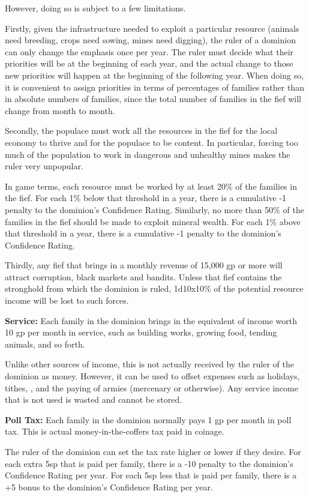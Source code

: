 \begin{multicols*}{2}
However, doing so is subject to a few limitations.

Firstly, given the infrastructure needed to exploit a particular resource (animals need breeding, crops need sowing, mines need digging), the ruler of a dominion can only change the emphasis once per year. The ruler must decide what their priorities will be at the beginning of each year, and the actual change to those new priorities will happen at the beginning of the following year. When doing so, it is convenient to assign priorities in terms of percentages of families rather than in absolute numbers of families, since the total number of families in the fief will change from month to month.

Secondly, the populace must work all the resources in the fief for the local economy to thrive and for the populace to be content. In particular, forcing too much of the population to work in dangerous and unhealthy mines makes the ruler very unpopular.

In game terms, each resource must be worked by at least 20\% of the families in the fief. For each 1\% below that threshold in a year, there is a cumulative -1 penalty to the dominion’s Confidence Rating. Similarly, no more than 50\% of the families in the fief should be made to exploit mineral wealth. For each 1\% above that threshold in a year, there is a cumulative -1 penalty to the dominion’s Confidence Rating.

Thirdly, any fief that brings in a monthly revenue of 15,000 gp or more will attract corruption, black markets and bandits. Unless that fief contains the stronghold from which the dominion is ruled, 1d10x10\% of the potential resource income will be lost to such forces.

\textbf{Service:} Each family in the dominion brings in the equivalent of income worth 10 gp per month in service, such as building works, growing food, tending animals, and so forth.

Unlike other sources of income, this is not actually received by the ruler of the dominion as money. However, it can be used to offset expenses such as holidays, tithes, , and the paying of armies (mercenary or otherwise). Any service income that is not used is wasted and cannot be stored.

\textbf{Poll Tax:} Each family in the dominion normally pays 1 gp per month in poll tax. This is actual money-in-the-coffers tax paid in coinage.

The ruler of the dominion can set the tax rate higher or lower if they desire. For each extra 5sp that is paid per family, there is a -10 penalty to the dominion’s Confidence Rating per year. For each 5sp less that is paid per family, there is a +5 bonus to the dominion’s Confidence Rating per year.


\end{multicols*}
